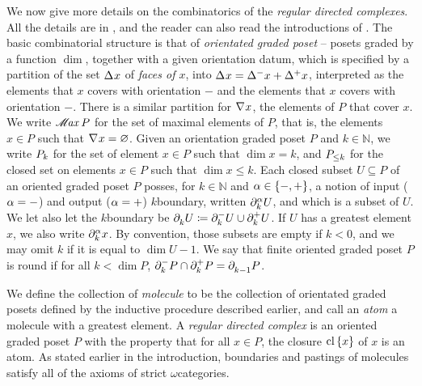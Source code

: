 We now give more details on the combinatorics of the \emph{regular directed complexes}.
All the details are in \cite{hadzihasanovic2024combinatorics}, and the reader can also read the introductions of \cite{chanavat2024model,chanavat2024equivalences,chanavat2024equivalences}.
The basic combinatorial structure is that of \emph{orientated graded poset} -- posets graded by a function \( \dim \), together with a given orientation datum, which is specified by a partition of the set \( \faces{}{} x \) of \emph{faces of \( x \)}, into \( \faces{}{} x = \faces{}{-} x + \faces{}{+} x \), interpreted as the elements that \( x \) covers with orientation \( - \) and the elements that \( x \) covers with orientation \( - \). 
There is a similar partition for \( \cofaces{}{} x \), the elements of \( P \) that cover \( x \).
We write \( \maxel{P} \) for the set of maximal elements of \( P \), that is, the elements \( x \in P \) such that \( \cofaces{}{} x = \varnothing \).
Given an orientation graded poset \( P \) and \( k \in \mathbb{N} \), we write \( \gr{k}{P} \) for the set of element \( x \in P \) such that \( \dim x = k \), and \( \gr{\le k}{P} \) for the closed set on elements \( x \in P \) such that \( \dim x \le k \). 
Each closed subset \( U \subseteq P \) of an oriented graded poset \( P \) posses, for \( k \in \mathbb{N} \) and \( \a \in \set{-, +} \), a notion of input (\( \a = - \)) and output (\( \a = + \)) \( k \)\nbd boundary, written \( \bd{k}{\a} U \), and which is a subset of \( U \). 
We let also let the \( k \)\nbd boundary be \( \bd{k}{} U \eqdef \bd{k}{-} U \cup \bd{k}{+} U \).
If \( U \) has a greatest element \( x \), we also write \( \bd{k}{\a} x \). 
By convention, those subsets are empty if \( k < 0 \), and we may omit \( k \) if it is equal to \( \dim U - 1 \).
We say that finite oriented graded poset \( P \) is round if for all \( k < \dim P  \), \( \bd{k}{-} P \cap \bd{k}{+} P = \bd{k - 1}{} P \).

We define the collection of \emph{molecule} to be the collection of orientated graded posets defined by the inductive procedure described earlier, and call an \emph{atom} a molecule with a greatest element.
A \emph{regular directed complex} is an oriented graded poset \( P \) with the property that for all \( x \in P \), the closure \( \clset{x} \) of \( x \) is an atom.
As stated earlier in the introduction, boundaries and pastings of molecules satisfy all of the axioms of strict \( \omega \)\nbd categories.

